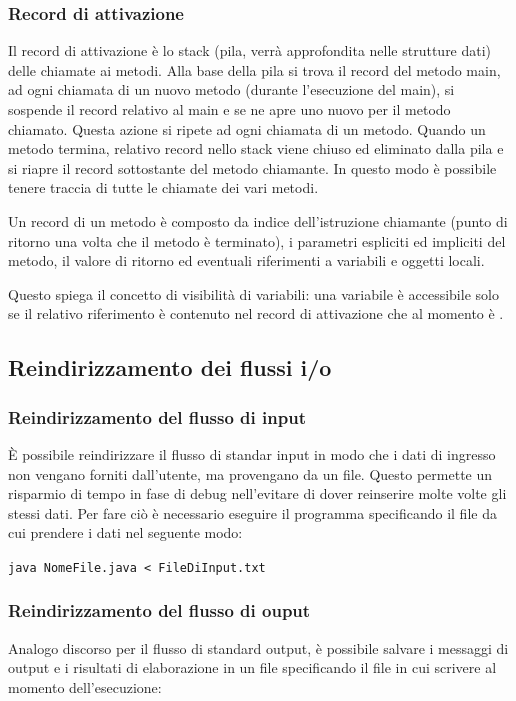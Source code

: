 \documentclass{article}
\begin{document}
\subsubsection*{Record di attivazione}
Il record di attivazione è lo stack (pila, verrà approfondita nelle strutture dati) delle chiamate ai metodi.
Alla base della pila si trova il record del metodo main, ad ogni chiamata di un nuovo metodo (durante l'esecuzione del main),
si sospende il record relativo al main e se ne apre uno nuovo per il metodo chiamato. Questa azione si ripete ad ogni chiamata
di un metodo.
Quando un metodo termina, relativo record nello stack viene chiuso ed eliminato dalla pila e si riapre il record sottostante del
metodo chiamante.
In questo modo è possibile tenere traccia di tutte le chiamate dei vari metodi.

Un record di un metodo è composto da indice dell'istruzione chiamante (punto di ritorno una volta che il metodo è terminato),
i parametri espliciti ed impliciti del metodo, il valore di ritorno ed eventuali riferimenti a variabili e oggetti locali.

Questo spiega il concetto di visibilità di variabili: una variabile è accessibile solo se il relativo riferimento è contenuto nel
record di attivazione che al momento è .

\subsection{Reindirizzamento dei flussi i/o}
\subsubsection*{Reindirizzamento del flusso di input}
È possibile reindirizzare il flusso di standar input in modo che i dati di ingresso non vengano forniti dall'utente, ma provengano
da un file. Questo permette un risparmio di tempo in fase di debug nell'evitare di dover reinserire molte volte gli stessi dati.
Per fare ciò è necessario eseguire il programma specificando il file da cui prendere i dati nel seguente modo:

\verb|java NomeFile.java < FileDiInput.txt|

\subsubsection*{Reindirizzamento del flusso di ouput}
Analogo discorso per il flusso di standard output, è possibile salvare i messaggi di output e i risultati di elaborazione in un file
specificando il file in cui scrivere al momento dell'esecuzione:
\end{document}
